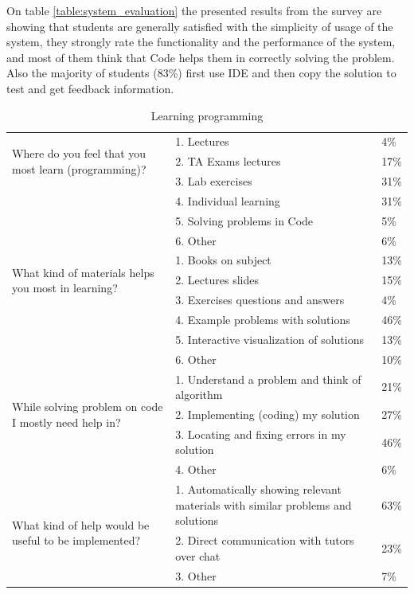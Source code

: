\documentclass{llncs}
\begin{document}
On table \ref{table:system_evaluation} the presented results from the survey are
showing that students are generally satisfied with the simplicity of usage of
the system, they strongly rate the functionality and the performance of the system,
and most of them think that Code helps them in correctly solving the problem.
Also the majority of students (83\%) first use IDE and then copy the solution to
test and get feedback information.
\begin{table}[htb]
\caption{Learning programming}
\begin{center}
\begin{tabular}{ |p{4cm}|p{7cm}|l| }
\hline
\multirow{3}{4cm}{Where do you feel that you most learn (programming)?} &
1. Lectures & 4\%\\
\cline{2-3}
 & 2. TA Exams lectures & 17\% \\
 \cline{2-3}
 & 3. Lab exercises & 31\% \\
 \cline{2-3}
 & 4. Individual learning & 31\% \\
 \cline{2-3}
 & 5. Solving problems in Code & 5\% \\
 \cline{2-3}
 & 6. Other & 6\%\\
\hline
\multirow{3}{4cm}{What kind of materials helps you most in learning?} &
1. Books on subject & 13\%\\
\cline{2-3}
 & 2. Lectures slides & 15\% \\
\cline{2-3}
 & 3. Exercises questions and answers & 4\% \\
\cline{2-3} 
 & 4. Example problems with solutions & 46\% \\
 \cline{2-3}
 & 5. Interactive visualization of solutions & 13\% \\
 \cline{2-3}
 & 6. Other & 10\%\\
\hline
\multirow{3}{4cm}{While solving problem on code I mostly need help in?} &
1. Understand a problem and think of algorithm & 21\%\\
\cline{2-3}
 & 2. Implementing (coding) my solution & 27\% \\
 \cline{2-3}
 & 3. Locating and fixing errors in my solution & 46\% \\
 \cline{2-3}
 & 4. Other & 6\%\\
\hline
\multirow{3}{4cm}{What kind of help would be useful to be implemented?} &
1. Automatically showing relevant materials with similar problems and solutions
& 63\%\\
\cline{2-3}
 & 2. Direct communication with tutors over chat & 23\% \\
 \cline{2-3}
 & 3. Other & 7\%\\
\hline
\end{tabular}
\label{table:learning_programming}
\end{center}
\end{table}
\end{document}

